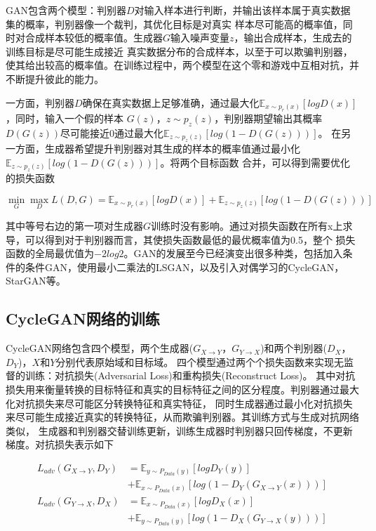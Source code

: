 GAN包含两个模型：判别器$D$对输入样本进行判断，并输出该样本属于真实数据集的概率，判别器像一个裁判，其优化目标是对真实
样本尽可能高的概率值，同时对合成样本较低的概率值。生成器$G$输入噪声变量$z$，输出合成样本，生成去的训练目标是尽可能生成接近
真实数据分布的合成样本，以至于可以欺骗判别器，使其给出较高的概率值。在训练过程中，两个模型在这个零和游戏中互相对抗，并不断提升彼此的能力。

一方面，判别器$D$确保在真实数据上足够准确，通过最大化$\mathbb{E}_{x\sim p_r(x)}\left[log D(x)\right]$，同时，输入一个假的样本
$G(z)$，$z\sim p_z(z)$，判别器期望输出其概率$D(G(z))$尽可能接近$0$通过最大化$\mathbb{E}_{z\sim p_z(z)}\left[log(1-D(G(z)))\right]$。
在另一方面，生成器希望提升判别器对其生成的样本的概率值通过最小化$\mathbb{E}_{z\sim p_z(z)}\left[log(1-D(G(z)))\right]$。将两个目标函数
合并，可以得到需要优化的损失函数

\begin{equation}
    \min_G \max_D L(D,G)=\mathbb{E}_{x\sim p_r(x)}\left[log D(x)\right] + \mathbb{E}_{z\sim p_z(z)}\left[log(1-D(G(z)))\right]
\end{equation}

其中等号右边的第一项对生成器$G$训练时没有影响。通过对损失函数在所有x上求导，可以得到对于判别器而言，其使损失函数最低的最优概率值为0.5，整个
损失函数的全局最优值为$-2log2$。GAN的发展至今已经演变出很多种类，包括加入条件的条件GAN，使用最小二乘法的LSGAN，以及引入对偶学习的CycleGAN，StarGAN等。

\subsection{CycleGAN网络的训练}
CycleGAN网络包含四个模型，两个生成器($G_{X\rightarrow Y}$，$G_{Y\rightarrow X}$)和两个判别器($D_X$，$D_Y$)，$X$和$Y$分别代表原始域和目标域。
四个模型通过两个个损失函数来实现无监督的训练：对抗损失(Adversarial Loss)和重构损失(Reconstruct Loss)。
其中对抗损失用来衡量转换的目标特征和真实的目标特征之间的区分程度。判别器通过最大化对抗损失来尽可能区分转换特征和真实特征，
同时生成器通过最小化对抗损失来尽可能生成接近真实的转换特征，从而欺骗判别器。其训练方式与生成对抗网络类似，
生成器和判别器交替训练更新，训练生成器时判别器只回传梯度，不更新梯度。对抗损失表示如下

\begin{align}
    L_{adv}(G_{X\rightarrow Y},D_Y) & =\mathbb{E}_{y\sim P_{Data}(y)}\left[log D_Y(y)\right] \\
    & + \mathbb{E}_{x\sim P_{Data}(x)}\left[log(1-D_Y(G_{X\rightarrow Y}(x)))\right] \\
    L_{adv}(G_{Y\rightarrow X},D_X) & =\mathbb{E}_{x\sim P_{Data}(x)}\left[log D_X(x)\right] \\
    & + \mathbb{E}_{y\sim P_{Data}(y)}\left[log(1-D_X(G_{Y\rightarrow X}(y)))\right] 
\end{align}


